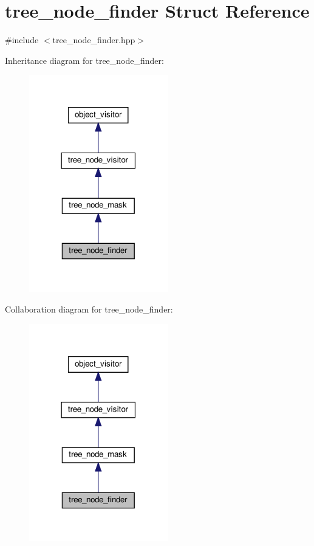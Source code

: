 \hypertarget{structtree__node__finder}{}\section{tree\+\_\+node\+\_\+finder Struct Reference}
\label{structtree__node__finder}


{\ttfamily \#include $<$tree\+\_\+node\+\_\+finder.\+hpp$>$}



Inheritance diagram for tree\+\_\+node\+\_\+finder\+:
\nopagebreak
\begin{figure}[H]
\begin{center}
\leavevmode
\includegraphics[width=171pt]{d6/de3/structtree__node__finder__inherit__graph}
\end{center}
\end{figure}


Collaboration diagram for tree\+\_\+node\+\_\+finder\+:
\nopagebreak
\begin{figure}[H]
\begin{center}
\leavevmode
\includegraphics[width=171pt]{de/da5/structtree__node__finder__coll__graph}
\end{center}
\end{figure}
